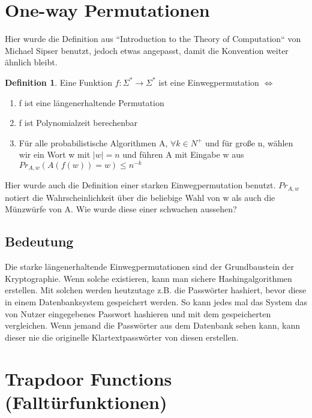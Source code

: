 \documentclass[12pt,a4paper]{article}
\theoremstyle{definition}
\newtheorem{definition}[theorem]{Definition}
\begin{document}
    \section{One-way Permutationen}

    Hier wurde die Definition aus ``Introduction to the Theory of Computation`` von Michael Sipser benutzt, jedoch
    etwas angepasst, damit die Konvention weiter ähnlich bleibt.

    \begin{definition}
        Eine Funktion $f: \Sigma^* \longrightarrow \Sigma^*$ ist eine Einwegpermutation $\Leftrightarrow$
        \begin{enumerate}
            \item f ist eine längenerhaltende Permutation
            \item f ist Polynomialzeit berechenbar
            \item Für alle probabilistische Algorithmen A, $\forall k \in N^+$ und für große n, wählen wir ein Wort w
            mit $|w| = n$ und führen A mit Eingabe w aus \\
            $Pr_{A, w}(A(f(w)) = w) \leq n^{-k}$
        \end{enumerate}
    \end{definition}

    Hier wurde auch die Definition einer starken Einwegpermutation benutzt. $Pr_{A, w}$ notiert die Wahrscheinlichkeit
    über die beliebige Wahl von w als auch die Münzwürfe von A.
    Wie wurde diese einer schwachen aussehen?

    \subsection{Bedeutung}
    Die starke längenerhaltende Einwegpermutationen sind der Grundbaustein der Kryptographie. Wenn solche existieren,
    kann man sichere Hashingalgorithmen erstellen. Mit solchen werden heutzutage z.B. die Passwörter hashiert, bevor
    diese in einem Datenbanksystem gespeichert werden. So kann jedes mal das System das von Nutzer eingegebenes Passwort
    hashieren und mit dem gespeicherten vergleichen. Wenn jemand die Passwörter aus dem Datenbank sehen kann, kann
    dieser nie die originelle Klartextpasswörter von diesen erstellen.

    \section{Trapdoor Functions (Falltürfunktionen)}
\end{document}
